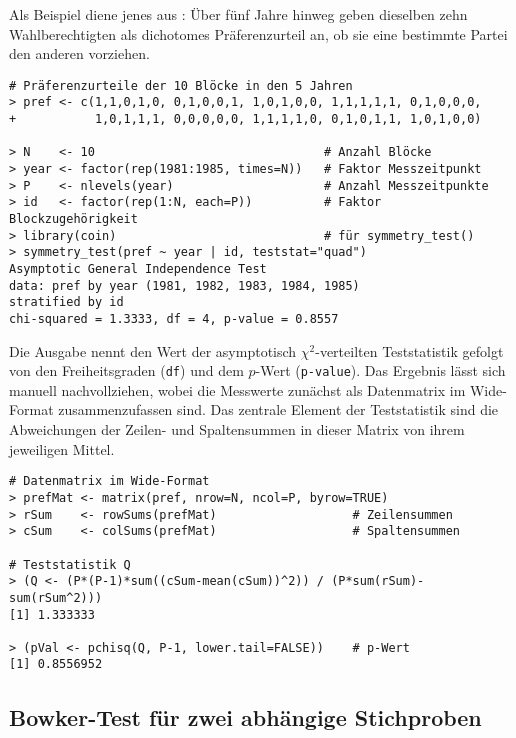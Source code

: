 Als Beispiel diene jenes aus : Über fünf Jahre hinweg geben dieselben zehn Wahlberechtigten als dichotomes Präferenzurteil an, ob sie eine bestimmte Partei den anderen vorziehen.
\begin{lstlisting}
# Präferenzurteile der 10 Blöcke in den 5 Jahren
> pref <- c(1,1,0,1,0, 0,1,0,0,1, 1,0,1,0,0, 1,1,1,1,1, 0,1,0,0,0,
+           1,0,1,1,1, 0,0,0,0,0, 1,1,1,1,0, 0,1,0,1,1, 1,0,1,0,0)

> N    <- 10                                # Anzahl Blöcke
> year <- factor(rep(1981:1985, times=N))   # Faktor Messzeitpunkt
> P    <- nlevels(year)                     # Anzahl Messzeitpunkte
> id   <- factor(rep(1:N, each=P))          # Faktor Blockzugehörigkeit
> library(coin)                             # für symmetry_test()
> symmetry_test(pref ~ year | id, teststat="quad")
Asymptotic General Independence Test
data: pref by year (1981, 1982, 1983, 1984, 1985)
stratified by id
chi-squared = 1.3333, df = 4, p-value = 0.8557
\end{lstlisting}

Die Ausgabe nennt den Wert der asymptotisch $\chi^{2}$-verteilten Teststatistik gefolgt von den Freiheitsgraden (\lstinline!df!) und dem $p$-Wert (\lstinline!p-value!). Das Ergebnis lässt sich manuell nachvollziehen, wobei die Messwerte zunächst als Datenmatrix im Wide-Format zusammenzufassen sind. Das zentrale Element der Teststatistik sind die Abweichungen der Zeilen- und Spaltensummen in dieser Matrix von ihrem jeweiligen Mittel.
\begin{lstlisting}
# Datenmatrix im Wide-Format
> prefMat <- matrix(pref, nrow=N, ncol=P, byrow=TRUE)
> rSum    <- rowSums(prefMat)                   # Zeilensummen
> cSum    <- colSums(prefMat)                   # Spaltensummen

# Teststatistik Q
> (Q <- (P*(P-1)*sum((cSum-mean(cSum))^2)) / (P*sum(rSum)-sum(rSum^2)))
[1] 1.333333

> (pVal <- pchisq(Q, P-1, lower.tail=FALSE))    # p-Wert
[1] 0.8556952
\end{lstlisting}

\subsection{Bowker-Test für zwei abhängige Stichproben}

